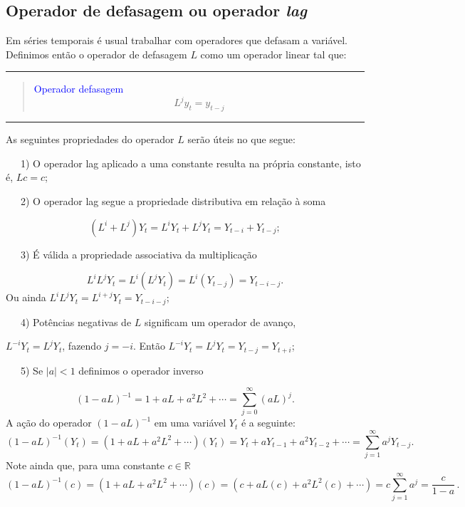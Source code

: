 \documentclass[
]{book}
\theoremstyle{definition}
\theoremstyle{definition}
\theoremstyle{definition}
\theoremstyle{remark}
\begin{document}
\hypertarget{operador-de-defasagem-ou-operador-lag}{%
\subsection{\texorpdfstring{Operador de defasagem ou operador \emph{lag}}{Operador de defasagem ou operador lag}}\label{operador-de-defasagem-ou-operador-lag}}

Em séries temporais é usual trabalhar com operadores que defasam a variável. Definimos então o operador de defasagem \(L\) como um operador linear tal que:

\begin{center}\rule{0.5\linewidth}{0.5pt}\end{center}

\begin{quote}
\textcolor{blue}{Operador defasagem}
\[
L^j y_t = y_{t-j}
\]
\end{quote}

\begin{center}\rule{0.5\linewidth}{0.5pt}\end{center}

As seguintes propriedades do operador \(L\) serão úteis no que segue:

~~~1) O operador lag aplicado a uma constante resulta na própria constante, isto é, \(Lc = c\);

~~~2) O operador lag segue a propriedade distributiva em relação à soma

\begin{equation*}
(L^i + L^j) Y_t = L^i Y_t + L^j Y_t = Y_{t-i} + Y_{t-j};
\end{equation*}

~~~3) É válida a propriedade associativa da multiplicação

\[L^i L^j Y_t = L^i (L^j Y_t ) = L^i (Y_{t-j} ) = Y_{t-i-j}.\]
Ou ainda \(L^i L^j Y_t = L^{i+j} Y_t = Y_{t-i-j}\);

~~~4) Potências negativas de \(L\) significam um operador de avanço,

\(L^{-i} Y_t =L^j Y_t\), fazendo \(j = -i\). Então \(L^{-i} Y_t = L^j Y_t = Y_{t-j} = Y_{t+i}\);

~~~5) Se \(|a| < 1\) definimos o operador inverso

\[(1-aL)^{-1} = 1 + aL + a^2 L^2 + \cdots = \sum_{j=0}^\infty (aL)^j.\]
A ação do operador \((1-aL)^{-1}\) em uma variável \(Y_t\) é a seguinte:
\[(1-aL)^{-1}(Y_t)=(1 + aL + a^2 L^2 + \cdots)(Y_t)=Y_t+aY_{t-1}+a^2Y_{t-2}+\cdots = \sum_{j=1}^\infty a^jY_{t-j}.\]
\noindent Note ainda que, para uma constante \(c\in\mathbb{R}\)
\[(1-aL)^{-1}(c)=(1 + aL + a^2 L^2 + \cdots)(c)=(c + aL(c) + a^2 L^2(c) + \cdots)=c\sum_{j=1}^\infty a^j=\frac{c}{1-a}\,.\]
\end{document}
